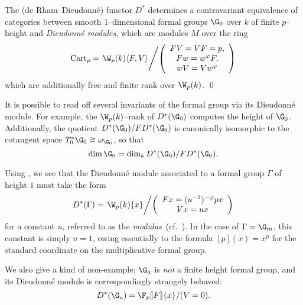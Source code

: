 \begin{theorem}\label{MainContraDieudonneThm}
The (de Rham--Dieudonn\'e) functor \(D^*\) determines a contravariant equivalence of categories between smooth \(1\)--dimensional formal groups \(\G_0\) over \(k\) of finite \(p\)--height and \textit{Dieudonn\'e modules}, which are modules \(M\) over the ring \[\Cart_p = \left. \W_p(k)\<F,V\> \middle/ \left( \begin{array}{c} FV = VF = p, \\ Fw = w^\phi F, \\ wV = Vw^\phi \end{array} \right) \right.\] which are additionally free and finite rank over \(\W_p(k)\). \qed
\end{theorem}

\begin{remark}\label{InvariantsFromDModule}
It is possible to read off several invariants of the formal group via its Dieudonn\'e module.  For example, the \(\W_p(k)\)--rank of \(D^*(\G_0)\) computes the height of \(\G_0\).  Additionally, the quotient \(D^*(\G_0) / FD^*(\G_0)\) is canonically isomorphic to the cotangent space \(T_0^* \G_0 \cong \omega_{\G_0}\), so that \[\dim \G_0 = \dim_k D^*(\G_0) / FD^*(\G_0).\]
\end{remark}

\begin{example}
Using , we see that the Dieudonn\'e module associated to a formal group \(\Gamma\) of height \(1\) must take the form \[D^*(\Gamma) = \left. \W_p(k)\{x\} \middle/ \left( \begin{array}{c} Fx = (u^{-1})^{-\phi}px \\ Vx = ux \end{array} \right)\right.\] for a constant \(u\), referred to as the \textit{modulus}~(cf.\ \cite[Theorem 4.2.2]{MoravaFormsOfKthy}).  In the case of \(\Gamma = \G_m\), this constant is simply \(u = 1\), owing essentially to the formula \([p](x) = x^p\) for the standard coordinate on the multiplicative formal group.
\end{example}

\begin{example}
We also give a kind of non-example: \(\G_a\) is \emph{not} a finite height formal group, and its Dieudonn\'e module is correspondingly strangely behaved: \[D^*(\G_a) = \F_p\ps{F}\{x\} / (V = 0).\]
\end{example}


